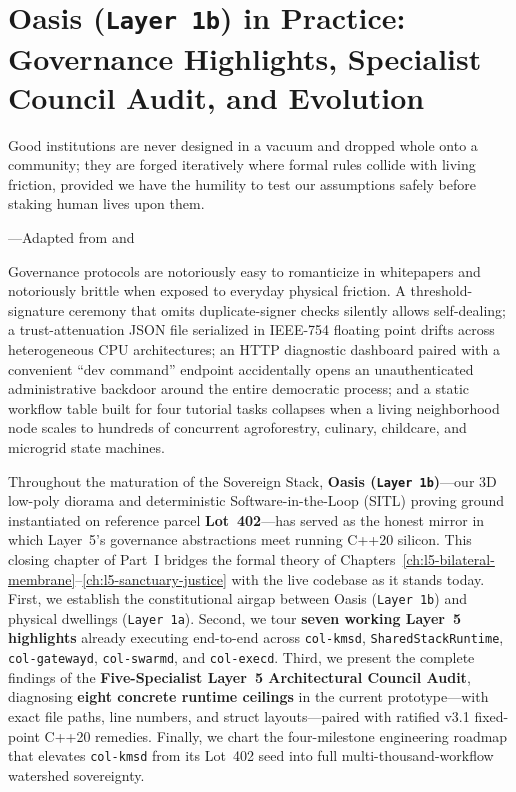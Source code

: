 \chapter{Oasis (\texttt{Layer 1b}) in Practice: Governance Highlights, Specialist Council Audit, and Evolution}
\label{ch:l5-oasis-council}

\epigraph{Good institutions are never designed in a vacuum and dropped whole onto a community; they are forged iteratively where formal rules collide with living friction, provided we have the humility to test our assumptions safely before staking human lives upon them.}{---Adapted from \textcite{ostrom1990} and \textcite{grieves2014digital}}

Governance protocols are notoriously easy to romanticize in whitepapers and notoriously brittle
when exposed to everyday physical friction. A threshold-signature ceremony that omits
duplicate-signer checks silently allows self-dealing; a trust-attenuation JSON file serialized
in IEEE-754 floating point drifts across heterogeneous CPU architectures; an HTTP diagnostic
dashboard paired with a convenient ``dev command'' endpoint accidentally opens an
unauthenticated administrative backdoor around the entire democratic process; and a static
workflow table built for four tutorial tasks collapses when a living neighborhood node scales to
hundreds of concurrent agroforestry, culinary, childcare, and microgrid state machines.

Throughout the maturation of the Sovereign Stack, \textbf{Oasis (\texttt{Layer 1b})}---our
3D low-poly diorama and deterministic Software-in-the-Loop (SITL) proving ground instantiated on
reference parcel \textbf{Lot~402}---has served as the honest mirror in which Layer~5's
governance abstractions meet running C++20 silicon. This closing chapter of Part~I bridges the
formal theory of Chapters~\ref{ch:l5-bilateral-membrane}--\ref{ch:l5-sanctuary-justice} with
the live codebase as it stands today. First, we establish the constitutional airgap between
Oasis (\texttt{Layer 1b}) and physical dwellings (\texttt{Layer 1a}). Second, we tour
\textbf{seven working Layer~5 highlights} already executing end-to-end across
\texttt{col-kmsd}, \texttt{SharedStackRuntime}, \texttt{col-gatewayd}, \texttt{col-swarmd}, and
\texttt{col-execd}. Third, we present the complete findings of the \textbf{Five-Specialist
Layer~5 Architectural Council Audit}, diagnosing \textbf{eight concrete runtime ceilings} in
the current prototype---with exact file paths, line numbers, and struct layouts---paired with
ratified v3.1 fixed-point C++20 remedies. Finally, we chart the four-milestone engineering
roadmap that elevates \texttt{col-kmsd} from its Lot~402 seed into full multi-thousand-workflow
watershed sovereignty.

